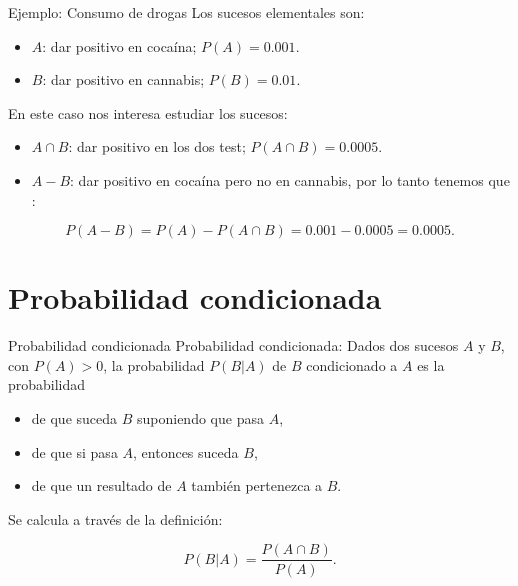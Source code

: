\documentclass[
  ignorenonframetext,
  aspectratio=169]{beamer}
\providecommand{\tightlist}{%
  \setlength{\itemsep}{0pt}\setlength{\parskip}{0pt}}\usepackage{longtable,booktabs,array}
\begin{document}
\begin{frame}{Ejemplo: Consumo de drogas}
\label{ejemplo-consumo-de-drogas-4}
Los sucesos elementales son:

\begin{itemize}
\tightlist
\item
  \(A\): dar positivo en cocaína; \(P(A)=0.001.\)
\item
  \(B\): dar positivo en cannabis; \(P(B)=0.01.\)
\end{itemize}

En este caso nos interesa estudiar los sucesos:

\begin{itemize}
\tightlist
\item
  \(A\cap B\): dar positivo en los dos test; \(P(A\cap B)=0.0005.\)
\item
  \(A-B\): dar positivo en cocaína pero no en cannabis, por lo tanto
  tenemos que :
\end{itemize}

\[P(A-B) =P(A)-P(A\cap B) =0.001-0.0005=0.0005.\]
\end{frame}

\section{Probabilidad condicionada}\label{probabilidad-condicionada}

\begin{frame}{Probabilidad condicionada}
\label{probabilidad-condicionada-1}
Probabilidad condicionada: Dados dos sucesos \(A\) y \(B\), con
\(P(A)>0\), la probabilidad \(P(B|A)\) de \(B\) condicionado a \(A\) es
la probabilidad

\begin{itemize}
\tightlist
\item
  de que suceda \(B\) suponiendo que pasa \(A\),
\item
  de que si pasa \(A\), entonces suceda \(B\),
\item
  de que un resultado de \(A\) también pertenezca a \(B\).
\end{itemize}

Se calcula a través de la definición:

\[
P(B|A)=\frac{P(A\cap B)}{P(A)}.
\]
\end{frame}
\end{document}
